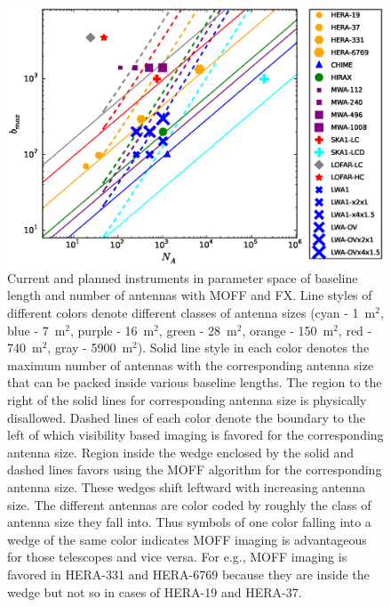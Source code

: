 \documentclass[a4paper,fleqn,usenatbib]{mnras}
\begin{document}
\begin{figure}
  \includegraphics[width=\columnwidth]{MOFF_FX_crossover_baseline_n-antennas_rho_fov_gridding_legended}
  \caption{Current and planned instruments in parameter space of
    baseline length and number of antennas with MOFF and FX. Line styles of 
    different colors denote different classes of antenna sizes (cyan - 1~m$^2$, 
    blue - 7~m$^2$, purple - 16~m$^2$, green - 28~m$^2$, orange - 150~m$^2$, 
    red - 740~m$^2$, gray - 5900~m$^2$). Solid line style in each color denotes 
    the maximum number of antennas with the corresponding antenna size that can 
    be packed inside various baseline lengths. The region to the right of the 
    solid lines for corresponding antenna size is physically disallowed. Dashed
    lines of each color denote the boundary to the left of which visibility
    based imaging is favored for the corresponding antenna size. Region inside 
    the wedge enclosed by the solid and dashed lines favors using the MOFF 
    algorithm for the corresponding antenna size. These wedges shift leftward 
    with increasing antenna size. The different antennas are color coded by 
    roughly the class of antenna size they fall into. Thus symbols of one 
    color falling into a wedge of the same color indicates MOFF imaging is 
    advantageous for those telescopes and vice versa. For e.g., MOFF imaging
    is favored in HERA-331 and HERA-6769 because they are inside the wedge 
    but not so in cases of HERA-19 and HERA-37.}
  \label{fig:parameter-space-bll-nant-instruments}
\end{figure}
\end{document}
